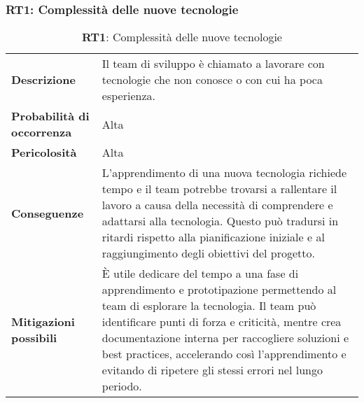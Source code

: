 \subsubsection{RT1: Complessità delle nuove tecnologie}
\begin{table}[h!]
    \centering
    \renewcommand{\arraystretch}{1.5} %
    \begin{tabularx}{\textwidth}{|X|X|}\hline
    \rowcolor[HTML]{FFD700} 
    \multicolumn{2}{|c|}{\textbf{Complessità delle nuove tecnologie}} \\ \hline
    \textbf{Descrizione} & Il team di sviluppo è chiamato a lavorare con tecnologie che non conosce o con cui ha poca esperienza. \\ \hline
    \textbf{Probabilità di occorrenza} & Alta \\ \hline
    \textbf{Pericolosità} & Alta \\ \hline
    \textbf{Conseguenze} &  L'apprendimento di una nuova tecnologia richiede tempo e il team potrebbe trovarsi a rallentare il lavoro a causa della necessità di comprendere e adattarsi alla tecnologia. 
    Questo può tradursi in ritardi rispetto alla pianificazione iniziale e al raggiungimento degli obiettivi del progetto. \\ \hline
    \textbf{Mitigazioni possibili} & È utile dedicare del tempo a una fase di apprendimento e prototipazione permettendo al team di esplorare la tecnologia. Il team può identificare punti di forza e criticità, mentre crea documentazione interna per raccogliere soluzioni e best practices, 
    accelerando così l'apprendimento e evitando di ripetere gli stessi errori nel lungo periodo. \\ \hline
    \end{tabularx}
    \caption{\textbf{RT1}: Complessità delle nuove tecnologie}
    \end{table}

\newpage

